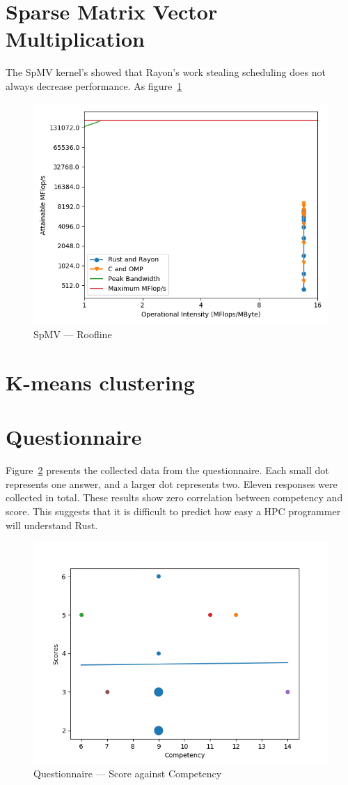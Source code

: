 \section{Sparse Matrix Vector Multiplication}\label{sec:res-sparse}
The SpMV kernel's showed that Rayon's work stealing scheduling does not always decrease performance. As figure~\ref{fig:roofline}
\begin{figure}[h]
\centering
\includegraphics[width=.8\linewidth]{figs/sparse/roofline.png}
\caption{SpMV --- Roofline}\label{fig:roofline}
\end{figure}
\section{K-means clustering}
\section{Questionnaire}
Figure~\ref{fig:questions} presents the collected data from the questionnaire. Each small dot represents one answer, and a larger dot represents two. Eleven responses were collected in total.
These results show zero correlation between competency and score. This suggests that it is difficult to predict how easy a HPC programmer will understand Rust. 

\begin{figure}[h]
\centering
\includegraphics[width=.8\linewidth]{figs/questions/scatter.png}
\caption{Questionnaire --- Score against Competency}\label{fig:questions}
\end{figure}

